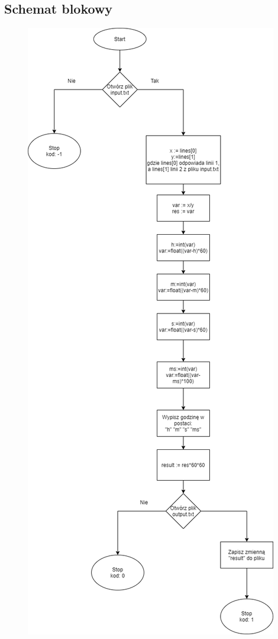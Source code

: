 \documentclass[12pt,a4paper]{article}
\begin{document}
	\subsection{Schemat blokowy}
	\newpage
	\begin{figure}[!htb]
	    \centering
	    \includegraphics[scale=0.45]{Schemat.png}
	\end{figure}
\end{document}
